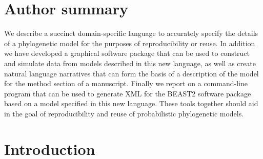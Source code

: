 \documentclass[10pt,letterpaper,table]{article}
\begin{document}
\section*{Author summary}
  We describe a succinct domain-specific language to accurately specify the details of a phylogenetic model for the purposes of reproducibility or reuse.
  In addition we have developed a graphical software package that can be used to construct and simulate data from models described in this new language, as well as create natural language narratives that can form the basis of a description of the model for the method section of a manuscript.
  Finally we report on a command-line program that can be used to generate XML for the BEAST2 software package based on a model specified in this new language.
  These tools together should aid in the goal of reproducibility and reuse of probabilistic phylogenetic models.


\linenumbers

\section*{Introduction}
\end{document}
